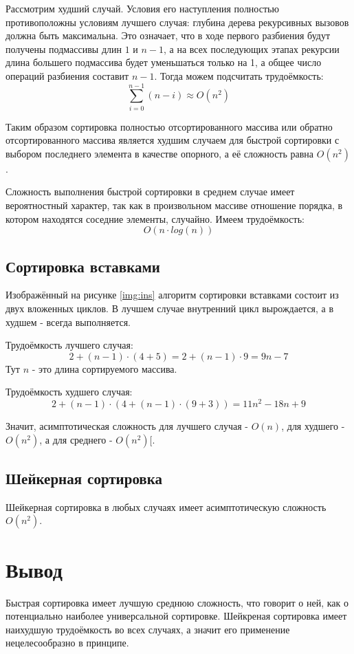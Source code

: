 Рассмотрим худший случай. Условия его наступления полностью противоположны условиям лучшего случая: глубина дерева рекурсивных вызовов должна быть максимальна. Это означает, что в ходе первого разбиения будут получены подмассивы длин $1$ и $n - 1$, а на всех последующих этапах рекурсии длина большего подмассива будет уменьшаться только на 1, а общее число операций разбиения составит $n - 1$. Тогда можем подсчитать трудоёмкость:
\begin{equation}
    \sum_{i = 0}^{n - 1}(n - i) \approx O(n^2)
\end{equation}

Таким образом сортировка полностью отсортированного массива или обратно отсортированного массива является худшим случаем для быстрой сортировки с выбором последнего элемента в качестве опорного, а её сложность равна $O(n^2)$.

Сложность выполнения быстрой сортировки в среднем случае имеет вероятностный характер, так как в произвольном массиве отношение порядка, в котором находятся соседние элементы, случайно. Имеем трудоёмкость\cite{knuth}:
\begin{equation}
    O(n \cdot{} log(n))
\end{equation}

\subsection{Сортировка вставками}
Изображённый на рисунке \ref{img:ins} алгоритм сортировки вставками состоит из двух вложенных циклов. В лучшем случае внутренний цикл вырождается, а в худшем - всегда выполняется.

Трудоёмкость лучшего случая:
\begin{equation}
    2 + (n - 1) \cdot{} (4 + 5) = 2 + (n - 1) \cdot{} 9 = 9n - 7
\end{equation}
Тут $n$ - это длина сортируемого массива.

Трудоёмкость худшего случая:
\begin{equation}
    2 + (n - 1) \cdot{} (4 + (n - 1) \cdot{} (9 + 3)) = 11n^2 - 18n + 9
\end{equation}

Значит, асимптотическая сложность для лучшего случая - $O(n)$, для худшего - $O(n^2)$, а для среднего - $O(n^2)$[\cite{knuth}.

\subsection{Шейкерная сортировка}
Шейкерная сортировка в любых случаях имеет асимптотическую сложность $O(n^2)$\cite{knuth}.

\section{Вывод}
Быстрая сортировка имеет лучшую среднюю сложность, что говорит о ней, как о потенциально наиболее универсальной сортировке. Шейкреная сортировка имеет наихудшую трудоёмкость во всех случаях, а значит его применение нецелесообразно в принципе.


